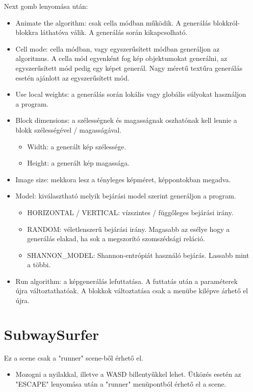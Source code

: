 Next gomb lenyomása után:
\begin{itemize}
    \label{item:WFC-hasznalat3}
        \item Animate the algorithm: csak cella módban működik. A generálás blokkról-blokkra láthatóva válik. A generálás során kikapcsolható.
        \item Cell mode: cella módban, vagy egyszerűsített módban generáljon az algoritmus. A cella mód egyenként fog kép objektumokat generálni, az egyszerűsített mód pedig egy képet generál. Nagy méretű textűra generálás esetén ajánlott az egyszerűsített mód.
        \item Use local weights: a generálás során lokális vagy globális súlyokat használjon a program.
        \item Block dimensions: a szélességnek és magasságnak oszhatónak kell lennie a blokk szélességével / magasságával.
        \begin{itemize}
            \item Width: a generált kép szélessége.
            \item Height: a generált kép magassága.
        \end{itemize}
        \item Image size: mekkora lesz a tényleges képméret, képpontokban megadva.
        \item Model: kiválasztható melyik bejárási model szerint generáljon a program.
        \begin{itemize}
            \item HORIZONTAL / VERTICAL: vízszintes / függőleges bejárási irány.
            \item RANDOM: véletlenszerű bejárási irány. Magasabb az esélye hogy a generálás elakad, ha sok a megszorító szomszédsági reláció.
            \item SHANNON\_MODEL: Shannon-entrópiát használó bejárás. Lassabb mint a többi.
        \end{itemize}
        \item Run algorithm: a képgenerálás lefuttatása. A futtatás után a paraméterek újra változtathatóak. A blokkok változtatása csak a menübe kilépve árhető el újra.
\end{itemize}
\section{SubwaySurfer}
Ez a scene csak a "runner" scene-ből érhető el.
\begin{itemize}
    \label{item:SubwaySurfer-hasznalat}
        \item Mozogni a nyilakkal, illetve a WASD billentyűkkel lehet. Ütközés esetén az "ESCAPE" lenyomása után a "runner" menüpontból érhető el a scene.
\end{itemize} 